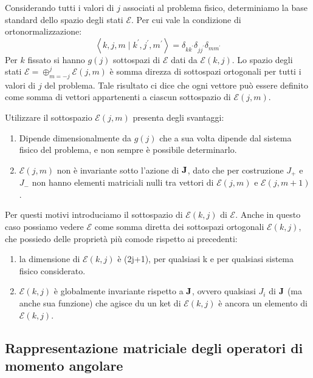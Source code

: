 Considerando tutti i valori di $j$ associati al problema fisico, determiniamo la base standard dello spazio degli stati $\mathcal{E}$. Per cui vale la condizione di ortonormalizzazione:
\begin{equation*}
	\left\langle k, j, m \mid k^{\prime}, j^{\prime}, m^{\prime}\right\rangle=\delta_{k k^{\prime}} \delta_{j j^{\prime}} \delta_{m m^{\prime}}
\end{equation*}
Per $k$ fissato si hanno $g(j)$ sottospazi di $\mathcal{E}$ dati da $\mathcal{E}(k,j)$. Lo spazio degli stati $\mathcal{E} = \oplus_{m=-j}^{j} \mathcal{E}(j,m) $  \`e somma direzza di sottospazi ortogonali per tutti i valori di $j$ del problema. Tale risultato ci dice che ogni vettore pu\`o essere definito come somma di vettori appartenenti a ciascun sottospazio di $\mathcal{E}(j,m)$.

Utilizzare il sottospazio $\mathcal{E}(j,m)$ presenta degli svantaggi:
\begin{enumerate}
	\item Dipende dimensionalmente da $g(j)$ che a sua volta dipende dal sistema fisico del problema, e non sempre \`e possibile determinarlo.
	\item $\mathcal{E}(j,m)$ non \`e invariante sotto l'azione di $\bold{J}$, dato che per costruzione $J_+$ e $J_-$ non hanno elementi matriciali nulli tra vettori di $\mathcal{E}(j,m)$ e $\mathcal{E}(j,m+1)$.
\end{enumerate} 

Per questi motivi introduciamo il sottospazio di $\mathcal{E}(k,j)$ di $\mathcal{E}$. Anche in questo caso possiamo vedere $\mathcal{E}$ come somma diretta dei sottospazi ortogonali $\mathcal{E}(k,j)$, che possiedo delle propriet\`a pi\`u comode rispetto ai precedenti:

\begin{enumerate}
	\item la dimensione di $\mathcal{E}(k,j)$ \`e (2j+1), per qualsiasi k e per qualsiasi sistema fisico considerato.
	\item $\mathcal{E}(k,j)$ \`e globalmente invariante rispetto a $\bold{J}$, ovvero qualsiasi $J_i$ di $\bold{J}$ (ma anche sua funzione) che agisce du un ket di $\mathcal{E}(k,j)$ \`e ancora un elemento di  $\mathcal{E}(k,j)$.
\end{enumerate}

\subsection{Rappresentazione matriciale degli operatori di momento angolare}

